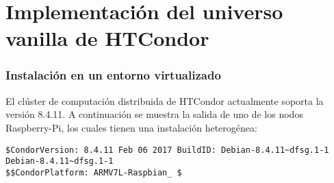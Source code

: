 

\chapter{Implementación del universo vanilla de HTCondor}

\subsection{Instalación en un entorno virtualizado}

El clúster de computación distribuida de HTCondor actualmente soporta la versión 8.4.11. A continuación se muestra la salida de uno de los nodos Raspberry-Pi, los cuales tienen una instalación heterogénea:

\begin{verbatim}
$CondorVersion: 8.4.11 Feb 06 2017 BuildID: Debian-8.4.11~dfsg.1-1 Debian-8.4.11~dfsg.1-1 
$$CondorPlatform: ARMV7L-Raspbian_ $
\end{verbatim}


